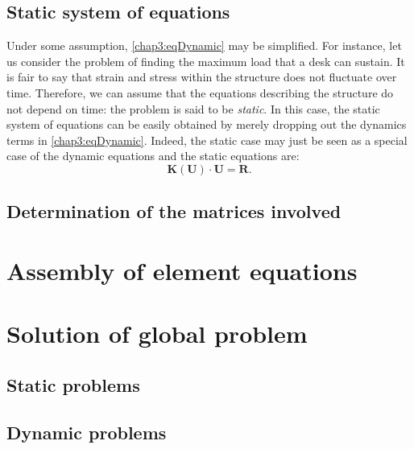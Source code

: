 	\subsection{Static system of equations}	
Under some assumption, \eqref{chap3:eqDynamic} may be simplified. For instance, let us consider the problem of finding the maximum load that a desk can sustain. It is fair to say that strain and stress within the structure does not fluctuate over time. Therefore, we can assume that the equations describing the structure do not depend on time: the problem is said to be \emph{static}. In this case, the static system of equations can be easily obtained by merely dropping out the dynamics terms in \eqref{chap3:eqDynamic}. Indeed, the static case may just be seen as a special case of the dynamic equations and the static equations are:
\begin{equation}
\label{chap3:eqStatic}
\mathbf{K}(\mathbf{U}) \cdot \mathbf{U} = \mathbf{R}.
\end{equation}

	\subsection{Determination of the matrices involved}
		

	
	

\section{Assembly of element equations}


\section{Solution of global problem}
	
	\subsection{Static problems}
	
	\subsection{Dynamic problems}
